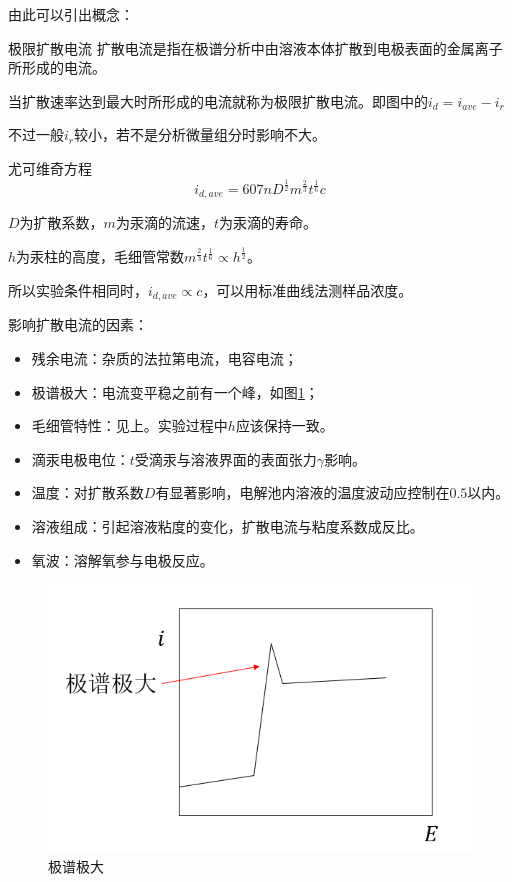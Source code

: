 由此可以引出概念：

\begin{definition*}{极限扩散电流}{}
	扩散电流是指在极谱分析中由溶液本体扩散到电极表面的金属离子所形成的电流。
	
	当扩散速率达到最大时所形成的电流就称为极限扩散电流。即图中的$i_d=i_{ave}-i_r$
\end{definition*}

不过一般$i_r$较小，若不是分析微量组分时影响不大。

\begin{theorem*}{尤可维奇方程}{}
	\begin{equation*}
		i_{d,ave}=607nD^{\frac{1}{2}}m^{\frac{2}{3}}t^{\frac{1}{6}}c
	\end{equation*}
	
	$D$为扩散系数，$m$为汞滴的流速，$t$为汞滴的寿命。
	
	$h$为汞柱的高度，毛细管常数$m^{\frac{2}{3}}t^{\frac{1}{6}}\propto h^{\frac{1}{2}}$。
\end{theorem*}

所以实验条件相同时，$i_{d,ave}\propto c$，可以用标准曲线法测样品浓度。

\begin{note}
	影响扩散电流的因素：
	\begin{itemize}
	\item 残余电流：杂质的法拉第电流，电容电流；
	\item 极谱极大：电流变平稳之前有一个峰，如图\ref{fig:chp7jipujida}；
	\item 毛细管特性：见上。实验过程中$h$应该保持一致。
	\item 滴汞电极电位：$t$受滴汞与溶液界面的表面张力$\gamma$影响。
	\item 温度：对扩散系数$D$有显著影响，电解池内溶液的温度波动应控制在$0.5$\textcelsius 以内。
	\item 溶液组成：引起溶液粘度的变化，扩散电流与粘度系数成反比。
	\item 氧波：溶解氧参与电极反应。
	\end{itemize}
\end{note}

\begin{figure}[!h]
	\centering
	\includegraphics[width=0.5\linewidth]{image/chp7_jipujida}
	\caption{极谱极大}
	\label{fig:chp7jipujida}
\end{figure}

